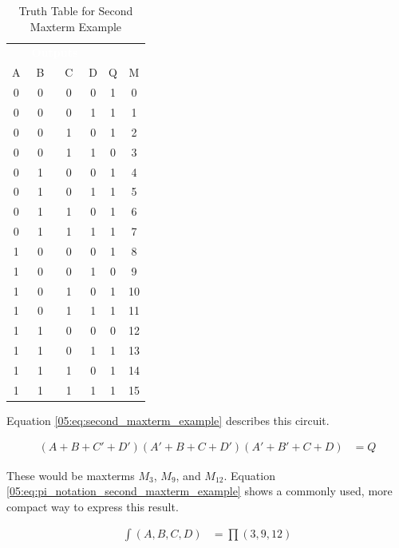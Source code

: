 \begin{table}[H]
  \sffamily
  \newcommand{\head}[1]{\textcolor{white}{\textbf{#1}}}    
  \begin{center}
    \begin{tabular}{cccc|cc} 
      \rowcolor{black!75}
      \multicolumn{4}{c}{\head{Inputs}} & \multicolumn{2}{c}{\head{Outputs}} \\
      A & B & C & D & Q & M \\
      \hline
      0 & 0 & 0 & 0 & 1 & 0 \\
      0 & 0 & 0 & 1 & 1 & 1 \\
      0 & 0 & 1 & 0 & 1 & 2 \\
      0 & 0 & 1 & 1 & 0 & 3 \\
      0 & 1 & 0 & 0 & 1 & 4 \\
      0 & 1 & 0 & 1 & 1 & 5 \\
      0 & 1 & 1 & 0 & 1 & 6 \\
      0 & 1 & 1 & 1 & 1 & 7 \\
      1 & 0 & 0 & 0 & 1 & 8 \\
      1 & 0 & 0 & 1 & 0 & 9 \\
      1 & 0 & 1 & 0 & 1 & 10 \\
      1 & 0 & 1 & 1 & 1 & 11 \\
      1 & 1 & 0 & 0 & 0 & 12 \\
      1 & 1 & 0 & 1 & 1 & 13 \\
      1 & 1 & 1 & 0 & 1 & 14 \\
      1 & 1 & 1 & 1 & 1 & 15 
    \end{tabular}
  \end{center}
  \caption{Truth Table for Second Maxterm Example}
  \label{05:tab:truth_table_for_second_maxterm_example}
\end{table}

Equation \ref{05:eq:second_maxterm_example} describes this circuit.

\begin{align}
  \label{05:eq:second_maxterm_example}
  (A+B+C'+D')(A'+B+C+D')(A'+B'+C+D) &= Q
\end{align}

These would be maxterms $ M_3 $, $ M_9 $, and $ M_{12} $. Equation \ref{05:eq:pi_notation_second_maxterm_example} shows a commonly used, more compact way to express this result.

\begin{align}
  \label{05:eq:pi_notation_second_maxterm_example}
  \int(A,B,C,D) &= \prod(3,9,12)
\end{align}

